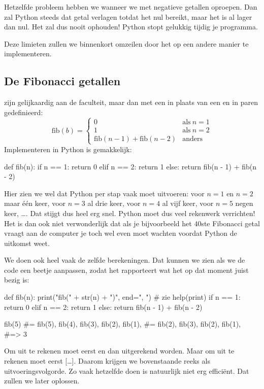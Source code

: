   Hetzelfde probleem hebben we wanneer we  met negatieve getallen
  oproepen. Dan zal Python steeds dat getal verlagen totdat het nul bereikt,
  maar het is al lager dan nul. Het zal dus nooit ophouden! Python stopt
  gelukkig tijdig je programma.

  Deze limieten zullen we binnenkort omzeilen door het op een andere manier te
  implementeren.

  \subsection{De Fibonacci getallen} zijn gelijkaardig aan de faculteit, maar
  dan met een \py{+} in plaats van een \py{*} en in paren gedefinieerd:
  \begin{equation*}
    \text{fib}\left(b\right) = %
    \begin{cases}
      0                                                       & \text{als}\ n=1 \\
      1                                                       & \text{als}\ n=2 \\
      \text{fib}\left(n-1\right) + \text{fib}\left(n-2\right) & \text{anders}
    \end{cases}
  \end{equation*}
  Implementeren in Python is gemakkelijk:
  \begin{python}
    def fib(n):
      if n == 1: return 0
      elif n == 2: return 1
      else: return fib(n - 1) + fib(n - 2)
  \end{python}

  Hier zien we wel dat Python per stap vaak  moet uitvoeren: voor $n=1$
  en $n=2$ maar \'e\'en keer, voor $n=3$ al drie keer, voor $n=4$ al vijf keer,
  voor $n=5$ negen keer, \ldots. Dat stijgt dus heel erg snel. Python moet dus
  veel rekenwerk verrichten! Het is dan ook niet verwonderlijk dat als je
  bijvoorbeeld het $40$ste Fibonacci getal vraagt aan de computer je toch wel
  even moet wachten voordat Python de uitkomst weet.

  We doen ook heel vaak de zelfde berekeningen. Dat kunnen we zien als we de
  code een beetje aanpassen, zodat het rapporteert wat het op dat moment juist
  bezig is:
  \begin{python}
    def fib(n):
      print("fib(" + str(n) + ")", end=", ") # zie help(print)
      if n == 1:   return 0
      elif n == 2: return 1
      else:        return fib(n - 1) + fib(n - 2)
  \end{python}
  \begin{python}
    fib(5)
    #= fib(5), fib(4), fib(3), fib(2), fib(1),
    #=   fib(2), fib(3), fib(2), fib(1),
    #=> 3
  \end{python}
  Om  uit te rekenen moet eerst  en dan 
  uitgerekend worden. Maar om  uit te rekenen moet eerst [\ldots].
  Daarom krijgen we bovenstaande reeks als uitvoeringsvolgorde.
  Zo vaak hetzelfde doen is natuurlijk niet erg effici\"ent. Dat zullen we later
  oplossen.


